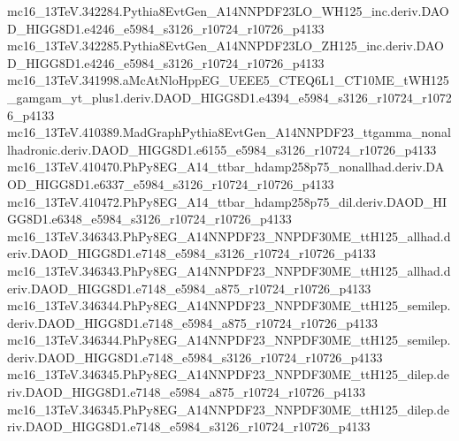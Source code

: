 \begin{scriptsize}
mc16\_13TeV.342284.Pythia8EvtGen\_A14NNPDF23LO\_WH125\_inc.deriv.DAOD\_HIGG8D1.e4246\_e5984\_s3126\_r10724\_r10726\_p4133 \\
mc16\_13TeV.342285.Pythia8EvtGen\_A14NNPDF23LO\_ZH125\_inc.deriv.DAOD\_HIGG8D1.e4246\_e5984\_s3126\_r10724\_r10726\_p4133 \\
mc16\_13TeV.341998.aMcAtNloHppEG\_UEEE5\_CTEQ6L1\_CT10ME\_tWH125\_gamgam\_yt\_plus1.deriv.DAOD\_HIGG8D1.e4394\_e5984\_s3126\_r10724\_r10726\_p4133 \\
mc16\_13TeV.410389.MadGraphPythia8EvtGen\_A14NNPDF23\_ttgamma\_nonallhadronic.deriv.DAOD\_HIGG8D1.e6155\_e5984\_s3126\_r10724\_r10726\_p4133 \\
mc16\_13TeV.410470.PhPy8EG\_A14\_ttbar\_hdamp258p75\_nonallhad.deriv.DAOD\_HIGG8D1.e6337\_e5984\_s3126\_r10724\_r10726\_p4133 \\
mc16\_13TeV.410472.PhPy8EG\_A14\_ttbar\_hdamp258p75\_dil.deriv.DAOD\_HIGG8D1.e6348\_e5984\_s3126\_r10724\_r10726\_p4133 \\
mc16\_13TeV.346343.PhPy8EG\_A14NNPDF23\_NNPDF30ME\_ttH125\_allhad.deriv.DAOD\_HIGG8D1.e7148\_e5984\_s3126\_r10724\_r10726\_p4133 \\
mc16\_13TeV.346343.PhPy8EG\_A14NNPDF23\_NNPDF30ME\_ttH125\_allhad.deriv.DAOD\_HIGG8D1.e7148\_e5984\_a875\_r10724\_r10726\_p4133 \\
mc16\_13TeV.346344.PhPy8EG\_A14NNPDF23\_NNPDF30ME\_ttH125\_semilep.deriv.DAOD\_HIGG8D1.e7148\_e5984\_a875\_r10724\_r10726\_p4133 \\
mc16\_13TeV.346344.PhPy8EG\_A14NNPDF23\_NNPDF30ME\_ttH125\_semilep.deriv.DAOD\_HIGG8D1.e7148\_e5984\_s3126\_r10724\_r10726\_p4133 \\
mc16\_13TeV.346345.PhPy8EG\_A14NNPDF23\_NNPDF30ME\_ttH125\_dilep.deriv.DAOD\_HIGG8D1.e7148\_e5984\_a875\_r10724\_r10726\_p4133 \\
mc16\_13TeV.346345.PhPy8EG\_A14NNPDF23\_NNPDF30ME\_ttH125\_dilep.deriv.DAOD\_HIGG8D1.e7148\_e5984\_s3126\_r10724\_r10726\_p4133 \\

\end{scriptsize}
